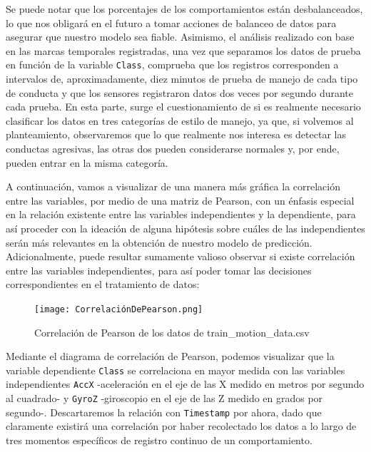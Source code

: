 \documentclass[runningheads]{llncs}
\begin{document}
Se puede notar que los porcentajes de los comportamientos están desbalanceados, lo que nos obligará en el futuro a tomar acciones de balanceo de datos para asegurar que nuestro modelo sea fiable. Asimismo, el análisis realizado con base en las marcas temporales registradas, una vez que separamos los datos de prueba en función de la variable \verb|Class|, comprueba que los registros corresponden a intervalos de, aproximadamente, diez minutos de prueba de manejo de cada tipo de conducta y que los sensores registraron datos dos veces por segundo durante cada prueba. En esta parte, surge el cuestionamiento de si es realmente necesario clasificar los datos en tres categorías de estilo de manejo, ya que, si volvemos al planteamiento, observaremos que lo que realmente nos interesa es detectar las conductas agresivas, las otras dos pueden considerarse normales y, por ende, pueden entrar en la misma categoría.

\newpage

\textsc A continuación, vamos a visualizar de una manera más gráfica la correlación entre las variables, por medio de una matriz de Pearson, con un énfasis especial en la relación existente entre las variables independientes y la dependiente, para así proceder con la ideación de alguna hipótesis sobre cuáles de las independientes serán más relevantes en la obtención de nuestro modelo de predicción. Adicionalmente, puede resultar sumamente valioso observar si existe correlación entre las variables independientes, para así poder tomar las decisiones correspondientes en el tratamiento de datos:\\

\begin{figure}
    \centering
    \texttt{[image: CorrelaciónDePearson.png]}
    \caption{Correlación de Pearson de los datos de train\_motion\_data.csv}
    \label{fig:comand}%
\end{figure}


\textsc Mediante el diagrama de correlación de Pearson, podemos visualizar que la variable dependiente \verb|Class| se correlaciona en mayor medida con las variables independientes \verb|AccX| -aceleración en el eje de las X medido en metros por segundo al cuadrado- y \verb|GyroZ| -giroscopio en el eje de las Z medido en grados por segundo-. Descartaremos la relación con \verb|Timestamp| por ahora, dado que claramente existirá una correlación por haber recolectado los datos a lo largo de tres momentos específicos de registro continuo de un comportamiento.\\
\end{document}
